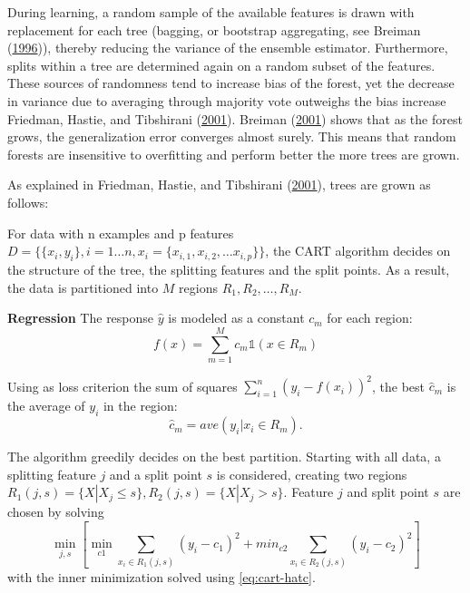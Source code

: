 \documentclass[
  11pt,
  a4paper,
  DIV=12,captions=tableheading,oneside,titlepage]{scrbook}
\begin{document}
During learning, a random sample of the available features is drawn with replacement for each tree (bagging, or bootstrap aggregating, see Breiman (\protect\hyperlink{ref-breiman1996bagging}{1996})), thereby reducing the variance of the ensemble estimator. Furthermore, splits within a tree are determined again on a random subset of the features. These sources of randomness tend to increase bias of the forest, yet the decrease in variance due to averaging through majority vote outweighs the bias increase Friedman, Hastie, and Tibshirani (\protect\hyperlink{ref-friedman2001elements}{2001}). Breiman (\protect\hyperlink{ref-breiman2001rf}{2001}) shows that as the forest grows, the generalization error converges almost surely. This means that random forests are insensitive to overfitting and perform better the more trees are grown.

As explained in Friedman, Hastie, and Tibshirani (\protect\hyperlink{ref-friedman2001elements}{2001}), trees are grown as follows:

For data with n examples and p features \(D = \{\{x_i,y_i\}, i=1 \ldots n, x_i=\{x_{i,1}, x_{i,2}, \ldots x_{i,p}\}\}\), the CART algorithm decides on the structure of the tree, the splitting features and the split points. As a result, the data is partitioned into \(M\) regions \(R_1, R_2, \ldots, R_M\).

\textbf{Regression} The response \(\hat{y}\) is modeled as a constant \(c_m\) for each region: \begin{equation}
f(x) = \sum_{m=1}^M c_m\mathbb{1}(x \in R_m)
\label{eq:cart-const}
\end{equation}

Using as loss criterion the sum of squares \(\sum_{i=1}^n (y_i - f(x_i))^2\), the best \(\hat{c}_m\) is the average of \(y_i\) in the region: \begin{equation}
\hat{c}_m=ave(y_i|x_i \in R_m).
\label{eq:cart-hatc}
\end{equation}

The algorithm greedily decides on the best partition. Starting with all data, a splitting feature \(j\) and a split point \(s\) is considered, creating two regions \(R_1(j,s) = \{X|X_j \leq s\}, R_2(j,s) = \{X|X_j > s\}\). Feature \(j\) and split point \(s\) are chosen by solving \begin{equation}
\min_{j,s}\left[\min_{c1} \sum_{x_i \in R_1(j,s)}(y_i-c_1)^2 + min_{c2} \sum_{x_i \in R_2(j,s)}(y_i-c_2)^2\right]
\label{eq:cart-opt}
\end{equation} with the inner minimization solved using \eqref{eq:cart-hatc}.
\end{document}
